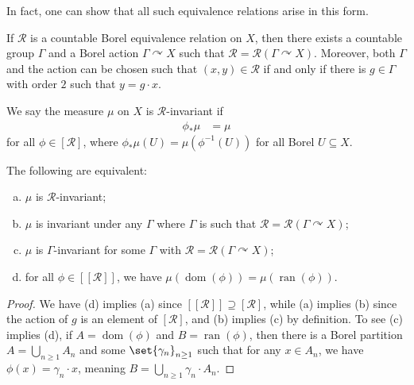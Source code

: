 \documentclass[10pt]{mypackage}
\begin{document}
In fact, one can show that all such equivalence relations arise in this form.
\begin{theorem}
  If $\mathcal{R}$ is a countable Borel equivalence relation on $X$, then there exists a countable group $\Gamma$ and a Borel action $\Gamma\curvearrowright X$ such that $\mathcal{R} = \mathcal{R}\left( \Gamma\curvearrowright X \right)$. Moreover, both $\Gamma$ and the action can be chosen such that $\left( x,y \right)\in \mathcal{R}$ if and only if there is $g\in \Gamma$ with order $2$ such that $y = g\cdot x$.
\end{theorem}
We say the measure $\mu$ on $X$ is $\mathcal{R}$-invariant if
\begin{align*}
  \phi_{\ast}\mu &= \mu
\end{align*}
for all $\phi\in \left[ \mathcal{R} \right]$, where $\phi_{\ast}\mu\left( U \right) = \mu\left( \phi^{-1}\left( U \right) \right)$ for all Borel $U\subseteq X$.
\begin{proposition}
  The following are equivalent:
  \begin{enumerate}[(a)]
    \item $\mu$ is $\mathcal{R}$-invariant;
    \item $\mu$ is invariant under any $\Gamma$ where $\Gamma$ is such that $\mathcal{R} = \mathcal{R}\left( \Gamma\curvearrowright X \right)$;
    \item $\mu$ is $\Gamma$-invariant for some $\Gamma$ with $ \mathcal{R} = \mathcal{R}\left( \Gamma\curvearrowright X \right) $;
    \item for all $\phi\in \left[ \left[ \mathcal{R} \right] \right]$, we have $\mu\left( \operatorname{dom}\left( \phi \right) \right) = \mu\left( \operatorname{ran}\left( \phi \right) \right)$.
  \end{enumerate}
\end{proposition}
\begin{proof}
  We have (d) implies (a) since $\left[ \left[ \mathcal{R} \right] \right]\supseteq \left[ \mathcal{R} \right]$, while (a) implies (b) since the action of $g$ is an element of $\left[ \mathcal{R} \right]$, and (b) implies (c) by definition. To see (c) implies (d), if $A = \operatorname{dom}\left( \phi \right)$ and $B = \operatorname{ran}\left( \phi \right)$, then there is a Borel partition $A = \bigcup_{n\geq 1}A_n$ and some $\set{\gamma_n}_{n\geq 1}$ such that for any $x\in A_n$, we have $\phi(x) = \gamma_n\cdot x$, meaning $B = \bigcup_{n\geq 1}\gamma_n\cdot A_n$.
\end{proof}
\end{document}
